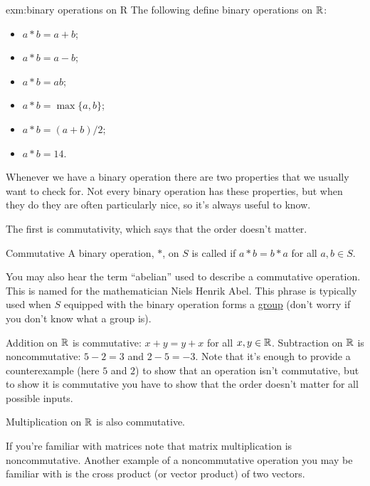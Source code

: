 \documentclass[fleqn]{LectureClass/LectureClass}
\begin{document}
    \begin{exm}{}{exm:binary operations on R}
        The following define binary operations on \(\mathbb{R}\):
        \begin{itemize}
            \item \(a * b = a + b\);
            \item \(a * b = a - b\);
            \item \(a * b = ab\);
            \item \(a * b = \max\{a, b\}\);
            \item \(a * b = (a + b) / 2\);
            \item \(a * b = 14\).
        \end{itemize}
    \end{exm}
    
    Whenever we have a binary operation there are two properties that we usually want to check for.
    Not every binary operation has these properties, but when they do they are often particularly nice, so it's always useful to know.
    
    The first is commutativity, which says that the order doesn't matter.
    
    \begin{dfn}{Commutative}{}
        A binary operation, \(*\), on \(S\) is called  if \(a * b = b * a\) for all \(a, b \in S\).
    \end{dfn}
    
    \begin{remark}{}{}
        You may also hear the term \enquote{abelian} used to describe a commutative operation.
        This is named for the mathematician Niels Henrik Abel.
        This phrase is typically used when \(S\) equipped with the binary operation forms a \href{https://en.wikipedia.org/wiki/Group_(mathematics)}{group} (don't worry if you don't know what a group is).
    \end{remark}
    
    \begin{exm}{}{}
        Addition on \(\mathbb{R}\) is commutative: \(x + y = y + x\) for all \(x, y \in \mathbb{R}\).
        Subtraction on \(\mathbb{R}\) is noncommutative: \(5 - 2 = 3\) and \(2 - 5 = -3\).
        Note that it's enough to provide a counterexample (here \(5\) and \(2\)) to show that an operation isn't commutative, but to show it is commutative you have to show that the order doesn't matter for all possible inputs.
        
        Multiplication on \(\mathbb{R}\) is also commutative.
        
        If you're familiar with matrices note that matrix multiplication is noncommutative.
        Another example of a noncommutative operation you may be familiar with is the cross product (or vector product) of two vectors.
    \end{exm}
    
\end{document}
